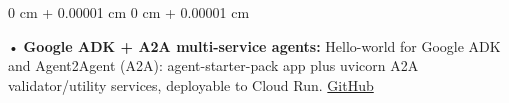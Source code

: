 \documentclass[10pt, letterpaper]{article}
\newenvironment{onecolentry}{
    \begin{adjustwidth}{
        0 cm + 0.00001 cm
    }{
        0 cm + 0.00001 cm
    }
}{
    \end{adjustwidth}
} %
\begin{document}
\begin{onecolentry}
     • \textbf{Google ADK + A2A multi-service agents:} Hello-world for Google ADK and Agent2Agent (A2A): agent-starter-pack app plus uvicorn A2A validator/utility services, deployable to Cloud Run. \href{https://github.com/daedalus-s/szns-adk-a2a}{GitHub}
\end{onecolentry}
\vspace{2 pt}
        \vspace{2 pt }
\end{document}
